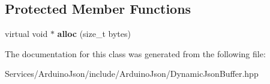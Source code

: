 \subsection*{Protected Member Functions}
\begin{DoxyCompactItemize}
\item 
\hypertarget{class_arduino_json_1_1_dynamic_json_buffer_a961d001c640fe6481b6f90798b115bdb}{}virtual void $\ast$ {\bfseries alloc} (size\+\_\+t bytes)\label{class_arduino_json_1_1_dynamic_json_buffer_a961d001c640fe6481b6f90798b115bdb}

\end{DoxyCompactItemize}


The documentation for this class was generated from the following file\+:\begin{DoxyCompactItemize}
\item 
Services/\+Arduino\+Json/include/\+Arduino\+Json/Dynamic\+Json\+Buffer.\+hpp\end{DoxyCompactItemize}
